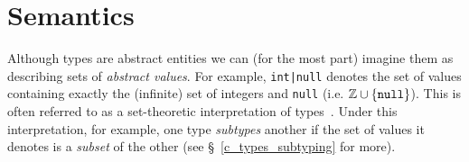 \section{Semantics}
\label{c_types_type_semantics}

Although types are abstract entities we can (for the most part) imagine them as describing sets of {\em abstract values}.  For example, \lstinline{int|null} denotes the set of values containing exactly the (infinite) set of integers and \lstinline{null} (i.e. ${\tt\mathbb{Z}\cup\{null\}}$).  This is often referred to as a set-theoretic interpretation of types~\cite{AW93,Damm94,CF05,FCB08}.  Under this interpretation, for example, one type {\em subtypes}  another if the set of values it denotes is a {\em subset} of the other (see \S~\ref{c_types_subtyping} for more).  



